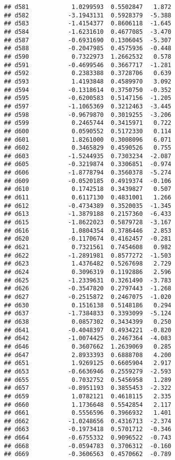 \documentclass[
]{article}
\begin{document}
\begin{verbatim}
## d581            1.0299593  0.5502847   1.872
## d582           -3.1943131  0.5928379  -5.388
## d583           -1.4154377  0.8606118  -1.645
## d584           -1.6231610  0.4677085  -3.470
## d587           -0.6931690  0.1306045  -5.307
## d588           -0.2047985  0.4575936  -0.448
## d590            0.7322973  1.2662532   0.578
## d591           -0.4699546  0.3667717  -1.281
## d592            0.2383388  0.3728706   0.639
## d593            1.4193848  0.4589970   3.092
## d594           -0.1318614  0.3750750  -0.352
## d595           -0.6200583  0.5147156  -1.205
## d597           -1.1065369  0.3212463  -3.445
## d598           -0.9679870  0.3019255  -3.206
## d599            0.2465744  0.3415971   0.722
## d600            0.0590552  0.5172330   0.114
## d601            1.8261000  0.3008096   6.071
## d602            0.3465829  0.4590526   0.755
## d603           -1.5244935  0.7303234  -2.087
## d605           -0.3219874  0.3306851  -0.974
## d606           -1.8778794  0.3560378  -5.274
## d609           -0.0520185  0.4919374  -0.106
## d610            0.1742518  0.3439827   0.507
## d611            0.6117130  0.4831001   1.266
## d612           -0.4734389  0.3520035  -1.345
## d613           -1.3879188  0.2157360  -6.433
## d615           -1.8622023  0.5879728  -3.167
## d616            1.0804354  0.3786446   2.853
## d620           -0.1170674  0.4162457  -0.281
## d621            0.7321561  0.7454608   0.982
## d622           -1.2891981  0.8577272  -1.503
## d623            1.4376482  0.5267698   2.729
## d624            0.3096319  0.1192886   2.596
## d625           -1.2339631  0.3261490  -3.783
## d626           -0.3547820  0.2797443  -1.268
## d627           -0.2515872  0.2467075  -1.020
## d630            0.1516138  0.5148186   0.294
## d637           -1.7384833  0.3393099  -5.124
## d638            0.0857302  0.3434399   0.250
## d641           -0.4048397  0.4934221  -0.820
## d642           -1.0074425  0.2467364  -4.083
## d646            0.3607662  1.2639069   0.285
## d647            2.8933393  0.6888708   4.200
## d651            1.9269125  0.6605904   2.917
## d653           -0.6636946  0.2559279  -2.593
## d655            0.7032752  0.5456958   1.289
## d657           -0.8951193  0.3855453  -2.322
## d659            1.0782121  0.4618115   2.335
## d660            1.1736648  0.5542854   2.117
## d661            0.5556596  0.3966932   1.401
## d662           -1.0248656  0.4316713  -2.374
## d663           -0.1973418  0.5701712  -0.346
## d664           -0.6755332  0.9096522  -0.743
## d668           -0.0594783  0.3706312  -0.160
## d669           -0.3606563  0.4570662  -0.789

\end{verbatim}
\end{document}
